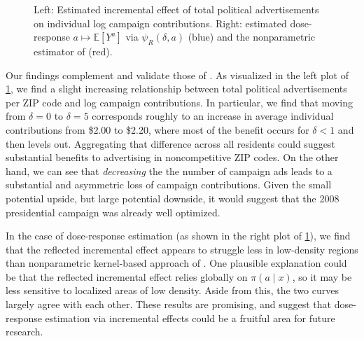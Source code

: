 \documentclass[11pt,twoside]{article}
\theoremstyle{definition}
\theoremstyle{remark}
\begin{document}
\begin{figure}[h]
  \caption{Left: Estimated incremental effect of total political advertisements on individual log campaign contributions. Right: estimated dose-response $a \mapsto \mathbb{E}[Y^a]$ via $\psi_R(\delta, a)$ (blue) and the nonparametric estimator of \cite{kennedy2017cte} (red).}
  \label{fig:incremental_and_dose_response}
\end{figure}


Our findings complement and validate those of \cite{urban2014dollars}. As visualized in the left plot of \cref{fig:incremental_and_dose_response}, we find a slight increasing relationship between total political advertisements per ZIP code and log campaign contributions. In particular, we find that moving from $\delta = 0$ to $\delta = 5$ corresponds roughly to an increase in average individual contributions from \$2.00 to \$2.20, where most of the benefit occurs for $\delta < 1$ and then levels out. Aggregating that difference across all residents could suggest substantial benefits to advertising in noncompetitive ZIP codes. On the other hand, we can see that \textit{decreasing} the the number of campaign ads leads to a substantial and asymmetric loss of campaign contributions. Given the small potential upside, but large potential downside, it would suggest that the 2008 presidential campaign was already well optimized. 

In the case of dose-response estimation (as shown in the right plot of \cref{fig:incremental_and_dose_response}), we find that the reflected incremental effect appears to struggle less in low-density regions than nonparametric kernel-based approach of \cite{kennedy2017cte}. One plausible explanation could be that the reflected incremental effect relies globally on $\pi(a \mid x)$, so it may be less sensitive to localized areas of low density. Aside from this, the two curves largely agree with each other. These results are promising, and suggest that dose-response estimation via incremental effects could be a fruitful area for future research.
\end{document}
